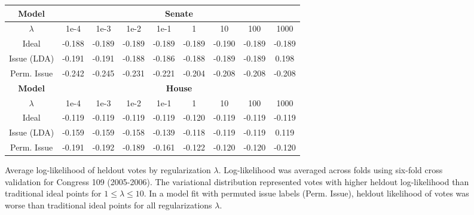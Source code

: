 \begin{figure}
  \caption{Average log-likelihood of heldout votes by regularization
    $\lambda$. Log-likelihood was averaged across folds using six-fold
    cross validation for Congress 109 (2005-2006).  The variational
    distribution represented votes with higher heldout log-likelihood
    than traditional ideal points for $1 \le \lambda \le 10$. In a
    model fit with permuted issue labels (Perm. Issue), heldout
    likelihood of votes was worse than traditional ideal points for
    all regularizations $\lambda$.
  } \center
  \begin{tabular}{|c|cccccccc|}
    \hline
    \textbf{Model} & \multicolumn{8}{|c|}{\textbf{Senate}} \\
    \hline
    \textbf{$\lambda$}
    & 1e-4
    &  1e-3 
    &  1e-2 
    &  1e-1 
    &  1 
    &  10 
    &  100
    &  1000  \\
    \hline
    Ideal
    &  -0.188 %
    &  -0.189 
    &  -0.189 %
    &  -0.189
    &  -0.189 %
    &  -0.190 %
    &  -0.189
    &  -0.189  \\ %
    Issue (LDA)
    & -0.191 %
    & -0.191
    & -0.188 %
    & -0.186 %
    & -0.188 %
    & -0.189
    & -0.189 %
    & 0.198 \\ 
     Perm. Issue 
    &  -0.242 
    &  -0.245 
    &  -0.231 
    &  -0.221 
    &  -0.204 
    &  -0.208 
    &  -0.208 
    &  -0.208  \\
    \hline
    \hline
    \textbf{Model} & \multicolumn{8}{|c|}{\textbf{House}} \\
    \hline
    \textbf{$\lambda$}
    & 1e-4
    &  1e-3 
    &  1e-2 
    &  1e-1 
    &  1 
    &  10 
    &  100
    &  1000  \\
    \hline
    Ideal
    &  -0.119 %
    &  -0.119 
    &  -0.119 %
    &  -0.119
    &  -0.120 %
    &  -0.119 %
    &  -0.119
    &  -0.119  \\ %
    Issue (LDA)
    & -0.159 %
    & -0.159
    & -0.158 %
    & -0.139 %
    & -0.118 %
    & -0.119
    & -0.119 %
    & 0.119 \\ 
     Perm. Issue 
    &  -0.191 
    &  -0.192 
    &  -0.189 
    &  -0.161 
    &  -0.122 
    &  -0.120 
    &  -0.120 
    &  -0.120  \\
    \hline
  \end{tabular}
  \normalsize
  \label{fig:lambda_comparison}
\end{figure}

